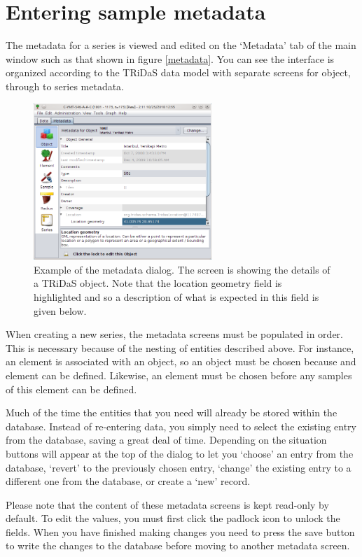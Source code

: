 \section{Entering sample metadata}

The metadata for a series is viewed and edited on the `Metadata' tab of the main window such as that shown in figure \ref{metadata}.  You can see the interface is organized according to the TRiDaS data model with separate screens for object, through to series metadata.  

\begin{figure}
\centering
\includegraphics[width=0.6\textwidth]{Images/metadata.png}
\caption{Example of the metadata dialog.  The screen is showing the details of a TRiDaS object.  Note that the location geometry field is highlighted and so a description of what is expected in this field is given below.} 
\label{fig:metadata}
\end{figure}

When creating a new series, the metadata screens must be populated in order.  This is necessary because of the nesting of entities described above.  For instance, an element is associated with an object, so an object must be chosen because and element can be defined.  Likewise, an element must be chosen before any samples of this element can be defined.  

Much of the time the entities that you need will already be stored within the database.  Instead of re-entering data, you simply need to select the existing entry from the database, saving a great deal of time.  Depending on the situation buttons will appear at the top of the dialog to let you `choose' an entry from the database, `revert' to the previously chosen entry, `change' the existing entry to a different one from the database, or create a `new' record.

Please note that the content of these metadata screens is kept read-only by default.  To edit the values, you must first click the padlock icon to unlock the fields.  When you have finished making changes you need to press the save button to write the changes to the database before moving to another metadata screen.

